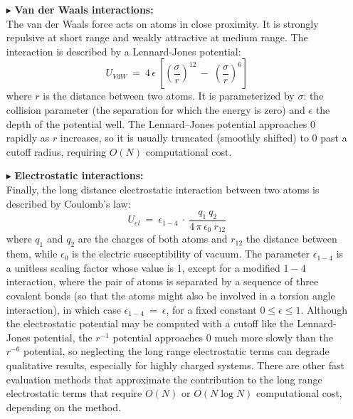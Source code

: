 \begin{itemize}
\item[$\blacktriangleright$] \textbf{Van der Waals interactions:}\\
The van der Waals force acts on atoms in close proximity. It is strongly repulsive at short range and weakly attractive at medium range. The interaction is described by a Lennard-Jones potential:
\begin{equation}\label{eq:LJpotential}
U_{VdW} \: = \: 4 \, \epsilon \: \left[ \left(\frac{\sigma}{r}\right)^{12} \,-\; \left(\frac{\sigma}{r}\right)^6 \right]
\end{equation}
where $r$ is the distance between two atoms. It is parameterized by $\sigma$: the collision parameter (the separation for which the energy is zero) and $\epsilon$ the depth of the potential well.
 The Lennard–Jones potential approaches 0 rapidly as $r$ increases, so it is usually truncated (smoothly shifted) to 0 past a cutoff radius, requiring $O(N)$ computational cost.

\item[$\blacktriangleright$] \textbf{Electrostatic interactions:}\\
Finally, the long distance electrostatic interaction between two atoms is described by Coulomb's law:
\begin{equation}\label{eq:Coulomb_potential}
U_{el} \: = \: \epsilon_{1-4} \: \cdot \: \frac{q_1 \: q_2}{4 \, \pi \, \epsilon_0 \: r_{12}}
\end{equation}
where $q_1$ and $q_2$ are the charges of both atoms and $r_{12}$ the distance between them, while $\epsilon_0$ is the electric susceptibility of vacuum.
The parameter $\epsilon_{1-4}$ is a unitless scaling factor whose value is 1, except for a modified $1-4$ interaction, where the pair of atoms is separated by a sequence of three covalent bonds (so that the atoms might also be involved in a torsion angle interaction), in which case $\epsilon_{1-4} \:=\: \epsilon$, for a fixed constant $0 \leq \epsilon \leq 1$. 
Although the electrostatic potential may be computed with a cutoff like the Lennard-Jones potential, the $r^{-1}$ potential approaches 0 much more slowly than the $r^{-6}$ potential, so neglecting the long range electrostatic terms can degrade qualitative results, especially for highly charged systems. There are other fast evaluation methods that approximate the contribution to the long range electrostatic terms that require $O(N)$ or $O(N \log N)$ computational cost, depending on the method.
\end{itemize}

